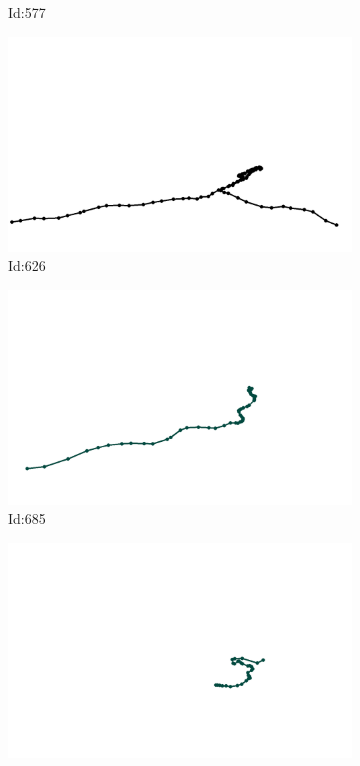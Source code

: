 \documentclass[12pt,twoside]{report}
\begin{document}
\begin{figure}
\begin{subfigure}[b]{0.20\textwidth}
\caption{Id:577}
\end{subfigure}
\begin{subfigure}[b]{0.20\textwidth}
\centering
\includegraphics[width=\textwidth]{../trajectories/626.png}
\caption{Id:626}
\end{subfigure}
\begin{subfigure}[b]{0.20\textwidth}
\centering
\includegraphics[width=\textwidth]{../trajectories/685.png}
\caption{Id:685}
\end{subfigure}
\begin{subfigure}[b]{0.20\textwidth}
\centering
\includegraphics[width=\textwidth]{../trajectories/776.png}

\end{subfigure}
\end{figure}
\end{document}
